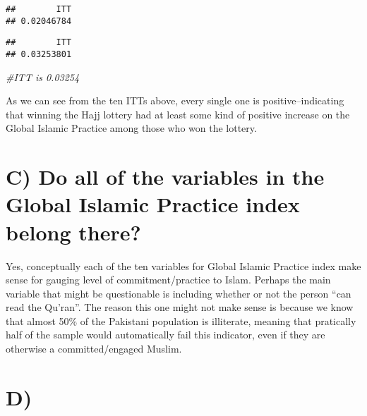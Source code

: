 \documentclass[
]{article}
\newenvironment{Shaded}{\begin{snugshade}}{\end{snugshade}}
\newcommand{\CommentTok}[1]{\textcolor[rgb]{0.56,0.35,0.01}{\textit{#1}}}
\newcommand{\FunctionTok}[1]{\textcolor[rgb]{0.00,0.00,0.00}{#1}}
\newcommand{\NormalTok}[1]{#1}
\newcommand{\SpecialCharTok}[1]{\textcolor[rgb]{0.00,0.00,0.00}{#1}}
\begin{document}
\begin{verbatim}
##        ITT 
## 0.02046784
\end{verbatim}

\begin{Shaded}
\end{Shaded}

\begin{verbatim}
##        ITT 
## 0.03253801
\end{verbatim}

\begin{Shaded}
\begin{Highlighting}[]
\CommentTok{\#ITT is 0.03254}
\end{Highlighting}
\end{Shaded}

As we can see from the ten ITTs above, every single one is
positive--indicating that winning the Hajj lottery had at least some
kind of positive increase on the Global Islamic Practice among those who
won the lottery.

\hypertarget{c-do-all-of-the-variables-in-the-global-islamic-practice-index-belong-there}{%
\section{C) Do all of the variables in the Global Islamic Practice index
belong
there?}\label{c-do-all-of-the-variables-in-the-global-islamic-practice-index-belong-there}}

Yes, conceptually each of the ten variables for Global Islamic Practice
index make sense for gauging level of commitment/practice to Islam.
Perhaps the main variable that might be questionable is including
whether or not the person ``can read the Qu'ran''. The reason this one
might not make sense is because we know that almost 50\% of the
Pakistani population is illiterate, meaning that pratically half of the
sample would automatically fail this indicator, even if they are
otherwise a committed/engaged Muslim.

\hypertarget{d}{%
\section{D)}\label{d}}
\end{document}
